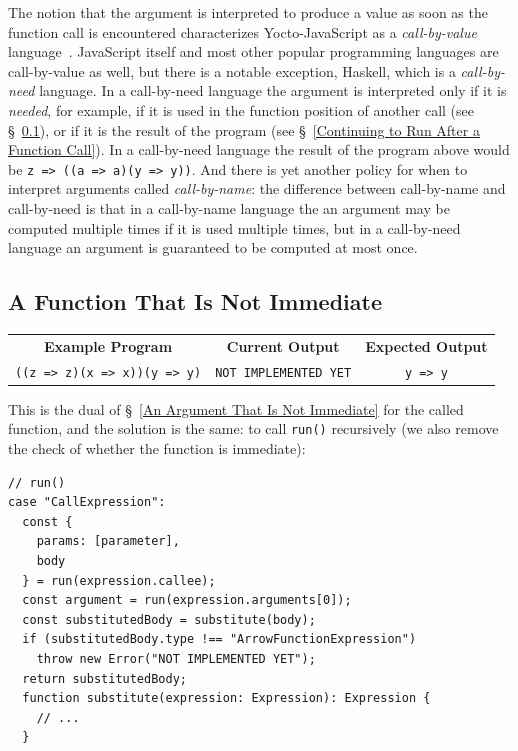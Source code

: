\documentclass[12pt, oneside]{book}
\begin{document}
\begin{mdframed}[frametitle = {Advanced}]
The notion that the argument is interpreted to produce a value as soon as the function call is encountered characterizes Yocto-JavaScript as a \emph{call-by-value} language~\cite{call-by-name-call-by-value-and-the-lambda-calculus}. JavaScript itself and most other popular programming languages are call-by-value as well, but there is a notable exception, Haskell, which is a \emph{call-by-need} language. In a call-by-need language the argument is interpreted only if it is \emph{needed}, for example, if it is used in the function position of another call (see §~\ref{A Function That Is Not Immediate}), or if it is the result of the program (see §~\ref{Continuing to Run After a Function Call}). In a call-by-need language the result of the program above would be \texttt{z => ((a => a)(y => y))}. And there is yet another policy for when to interpret arguments called \emph{call-by-name}: the difference between call-by-name and call-by-need is that in a call-by-name language the an argument may be computed multiple times if it is used multiple times, but in a call-by-need language an argument is guaranteed to be computed at most once.
\end{mdframed}

\subsection{A Function That Is Not Immediate}
\label{A Function That Is Not Immediate}

\begin{center}
\begin{tabular}{c|c|c}
\textbf{Example Program} & \textbf{Current Output} & \textbf{Expected Output} \\
\texttt{((z => z)(x => x))(y => y)} & \texttt{NOT IMPLEMENTED YET} & \texttt{y => y} \\
\end{tabular}
\end{center}

This is the dual of §~\ref{An Argument That Is Not Immediate} for the called function, and the solution is the same: to call \texttt{run()} recursively (we also remove the check of whether the function is immediate):

\begin{verbatim}
// run()
case "CallExpression":
  const {
    params: [parameter],
    body
  } = run(expression.callee);
  const argument = run(expression.arguments[0]);
  const substitutedBody = substitute(body);
  if (substitutedBody.type !== "ArrowFunctionExpression")
    throw new Error("NOT IMPLEMENTED YET");
  return substitutedBody;
  function substitute(expression: Expression): Expression {
    // ...
  }
\end{verbatim}
\end{document}
